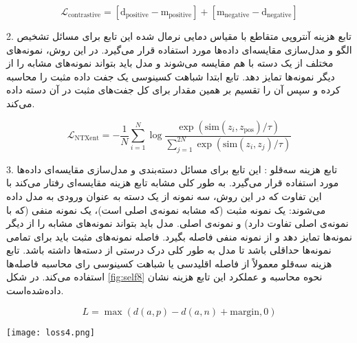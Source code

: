 \begin{equation}
\mathcal{L}_{\text{contrastive}} = [\text{d}_\text{positive} - \text{m}_\text{positive}] + [\text{m}_\text{negative} - \text{d}_\text{negative}]
\end{equation}




2. تابع هزینه آنتروپی متقاطع با مقیاس دمایی نرمال شده  این تابع برای مسائل تشخیص الگو و مدل‌سازی مقایسه‌ای داده‌ها مورد استفاده قرار می‌گیرد. در این روش، نمونه‌های مختلف از یک دسته با هم مقایسه می‌شوند و مدل باید بتواند نمونه‌های مشابه را از دیگر نمونه‌ها تمایز دهد. تابع ابتدا شباهت کسینوسی یک جفت داده مثبت را محاسبه کرده و سپس آن را تقسیم بر همین مقدار برای کل جفت‌های مثبت در آن دسته داده ‌می‌کند.
\citep{falcon2020framework}

\begin{equation}
	\mathcal{L}_{\text{NTXent}} = -\frac{1}{N} \sum_{i=1}^{N} \log \frac{\exp(\text{sim}(z_i, z_{\text{pos}}) / \tau)}{\sum_{j=1}^{2N} \exp(\text{sim}(z_i, z_j) / \tau)}
\end{equation}


3. تابع هزینه سه‌قلو  : 
این تابع برای مسائل دسته‌بندی و مدل‌سازی مقایسه‌ای داده‌ها مورد استفاده قرار می‌گیرد. به طور کلی مشابه تابع هزینه مقایسه‌ای رفتار می‌کند با این تفاوت که در این روش، سه نمونه از یک دسته به عنوان ورودی به مدل داده می‌شوند: یک نمونه مثبت (که مشابه نمونه‌ی اصلی است)، یک نمونه منفی (که با نمونه‌ی اصلی تفاوت دارد) و نمونه‌ی اصلی. مدل باید بتواند نمونه‌های مشابه را از دیگر نمونه‌ها تمایز دهد و از نمونه منفی فاصله بگیرد. فاصله نمونه‌های مثبت باید برای تمامی نمونه‌ها حداقلی باشد تا مدل به طور کلی درک درستی از دسته‌ها داشته باشد. تابع هزینه سه‌قلو معمولاً از فاصله اقلیدسی یا شباهت کسینوسی رای محاسبه فاصله‌ها استفاده می‌کند. در شکل  \ref{fig:self8}  نحوه محاسبه و عملکرد این تابع هزینه نشان داده‌شده‌است.
\citep{li2022tribyol}

\begin{equation}
	L = \max(d(a, p) - d(a, n) + \text{margin}, 0)
\end{equation}

\begin{minipage}{\linewidth}
	\centering
	\texttt{[image: loss4.png]}
	\captionsetup{font=small} %
	\label{fig:self8}
\end{minipage}


